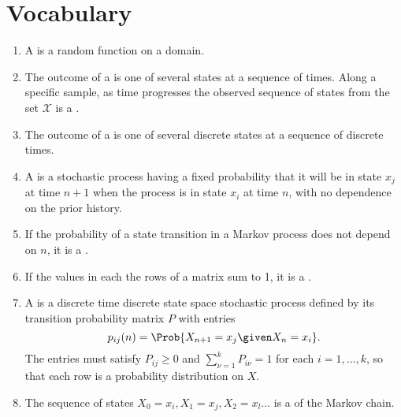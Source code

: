 \documentclass[12pt]{article}
\begin{document}
\hr

\section*{Vocabulary}
\begin{enumerate}
    \item
        A  is a random function on a domain.
    \item
        The outcome of a  is one of several states at a sequence of times.  Along
        a specific sample, as time progresses the observed sequence of
        states from the set \( \mathcal{X} \) is a .
    \item
        The outcome of a  is one of several discrete states at a sequence of discrete
    times.%
    \item
        A  is a stochastic process
        having a fixed probability that it will be in state \( x_j \) at
        time \( n+1 \) when the process is in state \( x_i \) at time \(
        n \), with no dependence on the prior history.
    \item
        If the probability of a state transition in a Markov process
        does not depend on \( n \), it is a .
    \item
        If the values in each the rows of a matrix sum to 1, it is a
        .
    \item
        A  is a discrete time discrete state space
        stochastic process defined by its transition probability matrix \( P \) with
        entries
        \[
            p_{ij}(n)=\Prob{X_{n+1}=x_j \given X_n=x_i}.
        \] The entries must satisfy \( P_{ij} \ge 0 \) and \( \sum_ {\nu=1}^k
        P_{i \nu} = 1 \) for each \( i=1, \dots, k \), so that each row is
        a probability distribution on \( X \).
    \item
        The sequence of states \( X_0 = x_i, X_1 = x_j, X_2 = x_l \dots \)
        is a  of the Markov chain. %

\end{enumerate}
\end{document}
